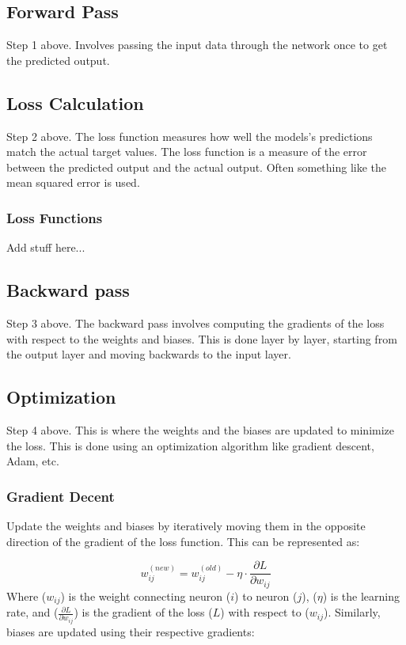 \documentclass{article}
\begin{document}
    
\subsection{Forward Pass}
Step 1 above. Involves passing the input data through the network once to get the predicted output. 

\subsection{Loss Calculation}
Step 2 above. The loss function measures how well the models's predictions match the actual target values. The loss function is a measure of the error between the predicted output and the actual output. Often something like the mean squared error is used. 

\subsubsection*{Loss Functions}
Add stuff here...

\subsection{Backward pass}
Step 3 above. The backward pass involves computing the gradients of the loss with respect to the weights and biases. This is done layer by layer, starting from the output layer and moving backwards to the input layer. 

\subsection{Optimization}
Step 4 above. This is where the weights and the biases are updated to minimize the loss. This is done using an optimization algorithm like gradient descent, Adam, etc. 

\subsubsection*{Gradient Decent}

Update the weights and biases by iteratively moving them in the opposite direction of the gradient of the loss function. This can be represented as:

\[ 
w_{ij}^{(new)} = w_{ij}^{(old)} - \eta \cdot \frac{\partial L}{\partial w_{ij}} 
\]
%
Where ($w_{ij}$) is the weight connecting neuron ($i$) to neuron ($j$), ($\eta$) is the learning rate, and ($\frac{\partial L}{\partial w_{ij}}$) is the gradient of the loss ($L$) with respect to ($w_{ij}$).
%
Similarly, biases are updated using their respective gradients:
\end{document}

